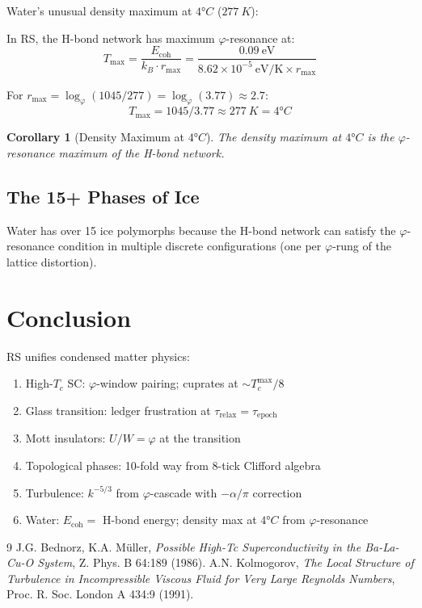 \documentclass[12pt,a4paper]{article}
\newtheorem{corollary}[theorem]{Corollary}
\theoremstyle{definition}
\theoremstyle{remark}
\begin{document}
Water's unusual density maximum at $4°C$ ($277~K$):

In RS, the H-bond network has maximum $\varphi$-resonance at:
\begin{equation}
T_\mathrm{max} = \frac{E_\mathrm{coh}}{k_B \cdot r_\mathrm{max}} 
= \frac{0.09~\mathrm{eV}}{8.62 \times 10^{-5}~\mathrm{eV/K} \times r_\mathrm{max}}
\end{equation}

For $r_\mathrm{max} = \log_\varphi(1045/277) = \log_\varphi(3.77) \approx 2.7$:
\begin{equation}
T_\mathrm{max} = 1045 / 3.77 \approx 277~K = 4°C
\end{equation}

\begin{corollary}[Density Maximum at $4°C$]
The density maximum at $4°C$ is the $\varphi$-resonance maximum of the H-bond network.
\end{corollary}

\subsection{The 15+ Phases of Ice}

Water has over 15 ice polymorphs because the H-bond network can satisfy the 
$\varphi$-resonance condition in multiple discrete configurations (one per 
$\varphi$-rung of the lattice distortion).

\section{Conclusion}

RS unifies condensed matter physics:
\begin{enumerate}
\item High-$T_c$ SC: $\varphi$-window pairing; cuprates at $\sim T_c^\mathrm{max}/8$
\item Glass transition: ledger frustration at $\tau_\mathrm{relax} = \tau_\mathrm{epoch}$
\item Mott insulators: $U/W = \varphi$ at the transition
\item Topological phases: 10-fold way from 8-tick Clifford algebra
\item Turbulence: $k^{-5/3}$ from $\varphi$-cascade with $-\alpha/\pi$ correction
\item Water: $E_\mathrm{coh} = $ H-bond energy; density max at $4°C$ from $\varphi$-resonance
\end{enumerate}

\begin{thebibliography}{9}
 J.G. Bednorz, K.A. Müller, \emph{Possible High-Tc Superconductivity in the Ba-La-Cu-O System}, Z. Phys. B 64:189 (1986).
 A.N. Kolmogorov, \emph{The Local Structure of Turbulence in Incompressible Viscous Fluid for Very Large Reynolds Numbers}, Proc. R. Soc. London A 434:9 (1991).
\end{thebibliography}
\end{document}
